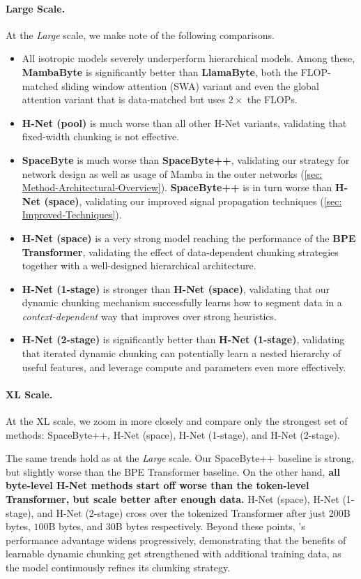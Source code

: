\paragraph{Large Scale.}
At the \emph{Large} scale, we make note of the following comparisons.
\begin{itemize}
    \item All isotropic models severely underperform hierarchical models. Among these, \textbf{MambaByte} is significantly better than \textbf{LlamaByte}, both the FLOP-matched sliding window attention (SWA) variant  and even the global attention variant that is data-matched but uses $2\times$ the FLOPs.
    \item \textbf{H-Net (pool)} is much worse than all other H-Net variants, validating that fixed-width chunking is not effective.
    \item \textbf{SpaceByte} is much worse than \textbf{SpaceByte++}, validating our strategy for network design as well as usage of Mamba in the outer networks (\cref{sec: Method-Architectural-Overview}).
    \textbf{SpaceByte++} is in turn worse than \textbf{H-Net (space)}, validating our improved signal propagation techniques (\cref{sec: Improved-Techniques}).
    \item \textbf{H-Net (space)} is a very strong model reaching the performance of the \textbf{BPE Transformer}, validating the effect of data-dependent chunking strategies together with a well-designed hierarchical architecture.
    \item \textbf{H-Net (1-stage)} is stronger than \textbf{H-Net (space)}, validating that our dynamic chunking mechanism successfully learns how to segment data in a \emph{context-dependent} way that improves over strong heuristics.
    \item \textbf{H-Net (2-stage)} is significantly better than \textbf{H-Net (1-stage)}, validating  that iterated dynamic chunking can potentially learn a nested hierarchy of useful features, and leverage compute and parameters even more effectively.
\end{itemize}

\paragraph{XL Scale.}
At the XL scale, we zoom in more closely and compare only the strongest set of methods: SpaceByte++, H-Net (space), H-Net (1-stage), and H-Net (2-stage).

The same trends hold as at the \emph{Large} scale.
Our SpaceByte++ baseline is strong, but slightly worse than the BPE Transformer baseline.
On the other hand, \textbf{all byte-level H-Net methods start off worse than the token-level Transformer, but scale better after enough data.}
H-Net (space), H-Net (1-stage), and H-Net (2-stage)
cross over the tokenized Transformer after just
$200$B bytes, $100$B bytes, and $30$B bytes respectively.
Beyond these points, \model{}'s performance advantage widens progressively, demonstrating that the benefits of learnable dynamic chunking get strengthened with additional training data,
as the model continuously refines its chunking strategy.

